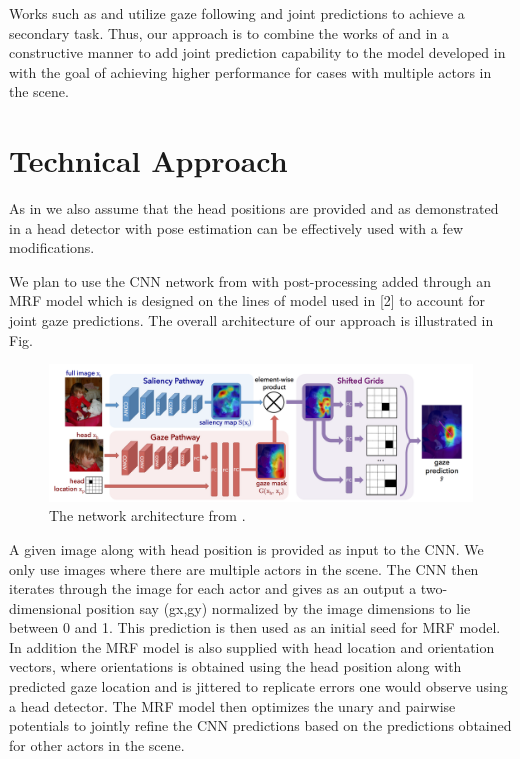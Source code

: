 \documentclass[10pt,twocolumn,letterpaper]{article}
\begin{document}
 Works such as \cite{nips15_recasens} and \cite{parks2015augmented} utilize gaze following and joint predictions to achieve a secondary task. Thus, our approach is to combine the works of \cite{fathi2012social} and \cite{nips15_recasens} in a constructive manner to add joint prediction capability to the model developed in \cite{fathi2012social} with the goal of achieving higher performance for cases with multiple actors in the scene.

\section{Technical Approach}

As in \cite{nips15_recasens} we also assume that the head positions are provided and as demonstrated in \cite{parks2015augmented} a head detector with pose estimation can be effectively used with a few modifications.

We plan to use the CNN network from \cite{nips15_recasens} with post-processing added through an MRF model which is designed on the lines of model used in [2] to account for joint gaze predictions. The overall architecture of our approach is illustrated in Fig.

\begin{figure}[t]
  \begin{center}
    \includegraphics[width=0.95\linewidth]{images/cnn.png}
  \end{center}
  \vspace{-0.3cm}
   \caption{The network architecture from \cite{nips15_recasens}.}
  \vspace{-0.5cm}
\end{figure}

A given image along with head position is provided as input to the CNN. We only use images where there are multiple actors in the scene. The CNN then iterates through the image for each actor and gives as an output a two-dimensional position say (gx,gy) normalized by the image dimensions to lie between 0 and 1. This prediction is then used as an initial seed for MRF model. In addition the MRF model is also supplied with head location and orientation vectors, where orientations is obtained using the head position along with predicted gaze location and is jittered to replicate errors one would observe using a head detector. The MRF model then optimizes the unary and pairwise potentials to jointly refine the CNN predictions based on the predictions obtained for other actors in the scene.
\end{document}
